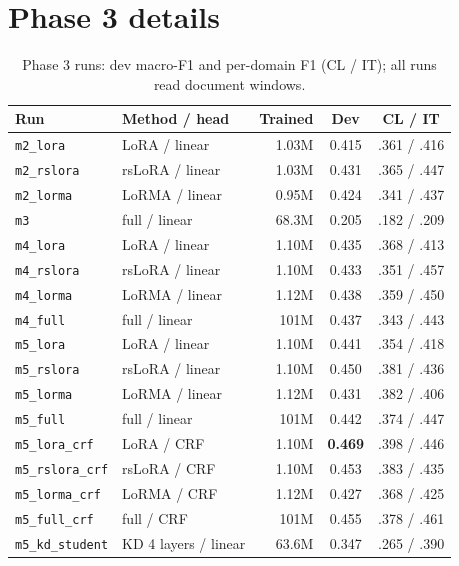 \documentclass[11pt, oneside]{article}
\newcommand{\run}[1]{\texttt{#1}}
\newcommand{\best}[1]{\textbf{#1}}
\begin{document}
\section{Phase 3 details}\label{app:p3}
\begin{table}[H]
\centering\small
\caption{Phase 3 runs: dev macro-F1 and per-domain F1 (CL / IT); all runs read document windows.}
\label{tab:p3runs}
\begin{tabular}{llrcc}
\toprule
Run & Method / head & Trained & Dev & CL / IT\\
\midrule
\run{m2\_lora}   & LoRA / linear   & 1.03M & 0.415 & .361 / .416\\
\run{m2\_rslora} & rsLoRA / linear & 1.03M & 0.431 & .365 / .447\\
\run{m2\_lorma}  & LoRMA / linear  & 0.95M & 0.424 & .341 / .437\\
\run{m3}         & full / linear   & 68.3M & 0.205 & .182 / .209\\
\run{m4\_lora}   & LoRA / linear   & 1.10M & 0.435 & .368 / .413\\
\run{m4\_rslora} & rsLoRA / linear & 1.10M & 0.433 & .351 / .457\\
\run{m4\_lorma}  & LoRMA / linear  & 1.12M & 0.438 & .359 / .450\\
\run{m4\_full}   & full / linear   & 101M  & 0.437 & .343 / .443\\
\run{m5\_lora}   & LoRA / linear   & 1.10M & 0.441 & .354 / .418\\
\run{m5\_rslora} & rsLoRA / linear & 1.10M & 0.450 & .381 / .436\\
\run{m5\_lorma}  & LoRMA / linear  & 1.12M & 0.431 & .382 / .406\\
\run{m5\_full}   & full / linear   & 101M  & 0.442 & .374 / .447\\
\run{m5\_lora\_crf}   & LoRA / CRF   & 1.10M & \best{0.469} & .398 / .446\\
\run{m5\_rslora\_crf} & rsLoRA / CRF & 1.10M & 0.453 & .383 / .435\\
\run{m5\_lorma\_crf}  & LoRMA / CRF  & 1.12M & 0.427 & .368 / .425\\
\run{m5\_full\_crf}   & full / CRF   & 101M  & 0.455 & .378 / .461\\
\run{m5\_kd\_student} & KD 4 layers / linear & 63.6M & 0.347 & .265 / .390\\
\bottomrule
\end{tabular}
\end{table}
\end{document}
